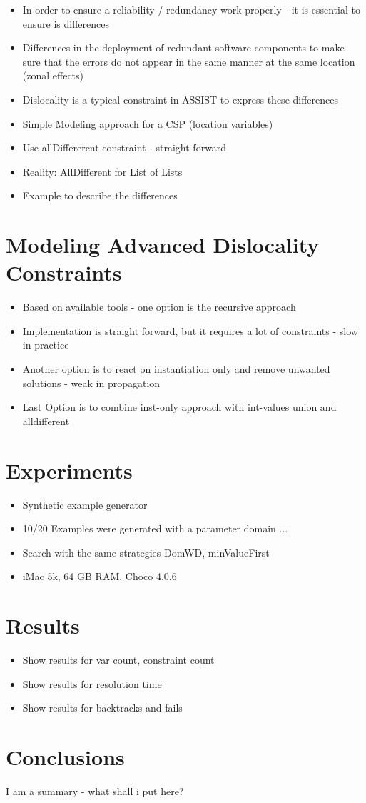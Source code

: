 \documentclass[english,biblatex]{lni}
\begin{document}
\begin{itemize}
\item In order to ensure a reliability / redundancy work properly - it is essential to ensure is differences
\item Differences in the deployment of redundant software components to make sure that the errors do not appear in the same manner at the same location (zonal effects)
\item Dislocality is a typical constraint in ASSIST to express these differences
\item Simple Modeling approach for a CSP (location variables)
\item Use allDiffererent constraint - straight forward
\item Reality: AllDifferent for List of Lists
\item Example to describe the differences
\end{itemize}

\section{Modeling Advanced Dislocality Constraints}

\begin{itemize}
\item Based on available tools - one option is the recursive approach
\item Implementation is straight forward, but it requires a lot of constraints - slow in practice
\item Another option is to react on instantiation only and remove unwanted solutions - weak in propagation
\item Last Option is to combine inst-only approach with int-values union and alldifferent
\end{itemize}

\section{Experiments}

\begin{itemize}
\item Synthetic example generator 
\item 10/20 Examples were generated with a parameter domain ...
\item Search with the same strategies DomWD, minValueFirst
\item iMac 5k, 64 GB RAM, Choco 4.0.6
\end{itemize}

\section{Results}

\begin{itemize}
\item Show results for var count, constraint count
\item Show results for resolution time
\item Show results for backtracks and fails
\end{itemize}

\section{Conclusions}

I am a summary - what shall i put here?

\printbibliography[heading=bibintoc]
\end{document}
